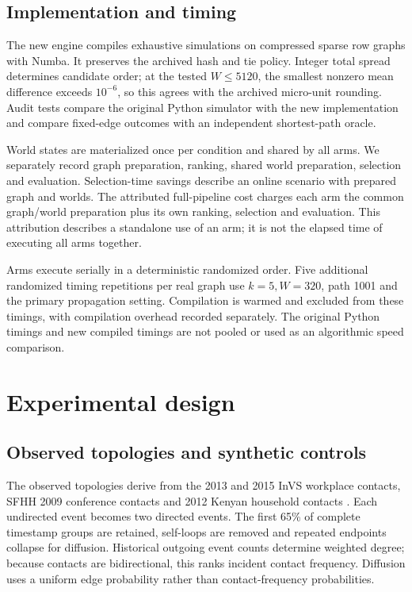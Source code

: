 \documentclass[smallextended]{svjour3}
\begin{document}
\subsection{Implementation and timing}
The new engine compiles exhaustive simulations on compressed sparse row graphs with Numba. It preserves the archived hash and tie policy. Integer total spread determines candidate order; at the tested $W\leq5120$, the smallest nonzero mean difference exceeds $10^{-6}$, so this agrees with the archived micro-unit rounding. Audit tests compare the original Python simulator with the new implementation and compare fixed-edge outcomes with an independent shortest-path oracle.

World states are materialized once per condition and shared by all arms. We separately record graph preparation, ranking, shared world preparation, selection and evaluation. Selection-time savings describe an online scenario with prepared graph and worlds. The attributed full-pipeline cost charges each arm the common graph/world preparation plus its own ranking, selection and evaluation. This attribution describes a standalone use of an arm; it is not the elapsed time of executing all arms together.

Arms execute serially in a deterministic randomized order. Five additional randomized timing repetitions per real graph use $k=5,W=320$, path 1001 and the primary propagation setting. Compilation is warmed and excluded from these timings, with compilation overhead recorded separately. The original Python timings and new compiled timings are not pooled or used as an algorithmic speed comparison.

\section{Experimental design}
\subsection{Observed topologies and synthetic controls}
The observed topologies derive from the 2013 and 2015 InVS workplace contacts, SFHH 2009 conference contacts and 2012 Kenyan household contacts \cite{ref3,ref4,ref5,ref6}. Each undirected event becomes two directed events. The first 65\% of complete timestamp groups are retained, self-loops are removed and repeated endpoints collapse for diffusion. Historical outgoing event counts determine weighted degree; because contacts are bidirectional, this ranks incident contact frequency. Diffusion uses a uniform edge probability rather than contact-frequency probabilities.
\end{document}
